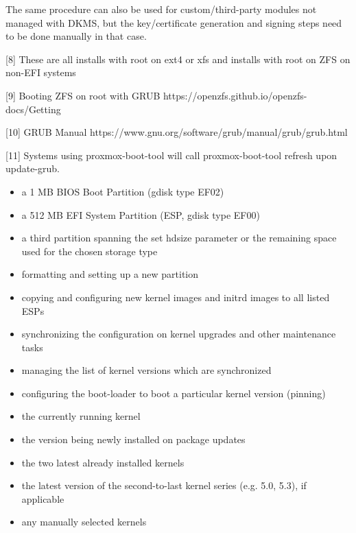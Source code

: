 The same procedure can also be used for custom/third-party modules not managed with DKMS, but the key/certificate generation and signing steps need to be done manually in that case.

[8] These are all installs with root on ext4 or xfs and installs with root on ZFS on non-EFI systems

[9] Booting ZFS on root with GRUB https://openzfs.github.io/openzfs-docs/Getting%

[10] GRUB Manual https://www.gnu.org/software/grub/manual/grub/grub.html

[11] Systems using proxmox-boot-tool will call proxmox-boot-tool refresh upon update-grub.

\begin{itemize}[leftmargin=2cm]

	\item a 1 MB BIOS Boot Partition (gdisk type EF02)

	\item a 512 MB EFI System Partition (ESP, gdisk type EF00)

	\item a third partition spanning the set hdsize parameter or the remaining space used for the chosen storage type

\end{itemize}

\begin{itemize}[leftmargin=2cm]

	\item formatting and setting up a new partition

	\item copying and configuring new kernel images and initrd images to all listed ESPs

	\item synchronizing the configuration on kernel upgrades and other maintenance tasks

	\item managing the list of kernel versions which are synchronized

	\item configuring the boot-loader to boot a particular kernel version (pinning)

\end{itemize}

\begin{itemize}[leftmargin=2cm]

	\item the currently running kernel

	\item the version being newly installed on package updates

	\item the two latest already installed kernels

	\item the latest version of the second-to-last kernel series (e.g. 5.0, 5.3), if applicable

	\item any manually selected kernels

\end{itemize}

